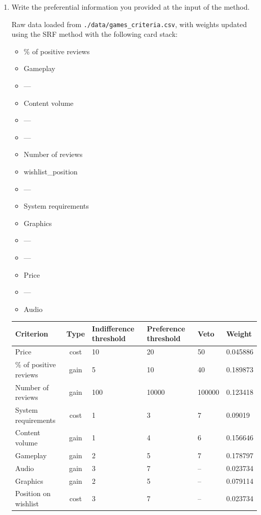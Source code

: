 \documentclass{article}
\begin{document}
\begin{enumerate}

    \item Write the preferential information you provided at the input of the method.

    Raw data loaded from \verb|./data/games_criteria.csv|, with weights updated
    using the SRF method with the following card stack:
    \begin{itemize}
        \item \% of positive reviews
        \item Gameplay
        \item ---
        \item Content volume
        \item ---
        \item ---
        \item Number of reviews
        \item wishlist\_position
        \item ---
        \item System requirements
        \item Graphics
        \item ---
        \item ---
        \item Price
        \item ---
        \item Audio
    \end{itemize}
    \begin{center}
        \begin{tabular}{l|c|m{6em}|m{6em}|m{6em}|l}
            Criterion & Type & Indifference threshold & Preference threshold & Veto & Weight \\
            \hline
            \hline
            Price & cost & 10 & 20 & 50 & 0.045886 \\
            \% of positive reviews & gain & 5 & 10 & 40 & 0.189873 \\
            Number of reviews & gain & 100 & 10000 & 100000 & 0.123418 \\
            System requirements & cost & 1 & 3 & 7 & 0.09019 \\
            Content volume & gain & 1 & 4 & 6 & 0.156646 \\
            Gameplay & gain & 2 & 5 & 7 & 0.178797 \\
            Audio & gain & 3 & 7 & -- & 0.023734 \\
            Graphics & gain & 2 & 5 & -- & 0.079114 \\
            Position on wishlist & cost & 3 & 7 & -- & 0.023734 \\
        \end{tabular}
    \end{center}



\end{enumerate}
\end{document}

